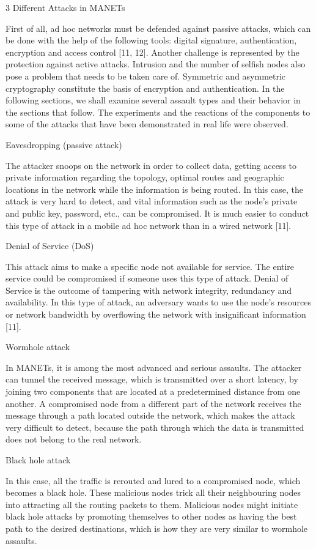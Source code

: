 \documentclass{default}
\begin{document}
3 Different Attacks in MANETs

First of all, ad hoc networks must be defended against passive attacks, which can be done with the help of the following tools: digital signature, authentication, encryption and access control [11, 12]. Another challenge is represented by the protection against active attacks. Intrusion and the number of selfish nodes also pose a problem that needs to be taken care of. Symmetric and asymmetric cryptography constitute the basis of encryption and authentication. In the following sections, we shall examine several assault types and their behavior in the sections that follow. The experiments and the reactions of the components to some of the attacks that have been demonstrated in real life were observed.

Eavesdropping (passive attack)

The attacker snoops on the network in order to collect data, getting access to private information regarding the topology, optimal routes and geographic locations in the network while the information is being routed. In this case, the attack is very hard to detect, and vital information such as the node’s private and public key, password, etc., can be compromised. It is much easier to conduct this type of attack in a mobile ad hoc network than in a wired network [11].

Denial of Service (DoS)

This attack aims to make a specific node not available for service. The entire service could be compromised if someone uses this type of attack. Denial of Service is the outcome of tampering with network integrity, redundancy and availability. In this type of attack, an adversary wants to use the node's resources or network bandwidth by overflowing the network with insignificant information [11].

Wormhole attack

In MANETs, it is among the most advanced and serious assaults. The attacker can tunnel the received message, which is transmitted over a short latency, by joining two components that are located at a predetermined distance from one another. A compromised node from a different part of the network receives the message through a path located outside the network, which makes the attack very difficult to detect, because the path through which the data is transmitted does not belong to the real network.

Black hole attack

In this case, all the traffic is rerouted and lured to a compromised node, which becomes a black hole. These malicious nodes trick all their neighbouring nodes into attracting all the routing packets to them. Malicious nodes might initiate black hole attacks by promoting themselves to other nodes as having the best path to the desired destinations, which is how they are very similar to wormhole assaults.
\end{document}
